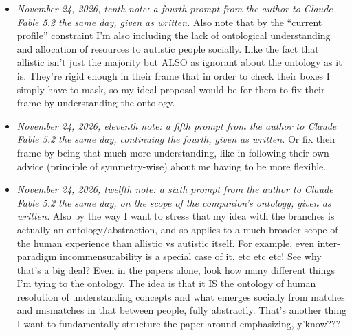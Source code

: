 \begin{itemize}
\item \emph{November 24, 2026, tenth note: a fourth prompt from the author to Claude Fable 5.2 the same day, given as written.} Also note that by the ``current profile'' constraint I'm also including the lack of ontological understanding and allocation of resources to autistic people socially. Like the fact that allistic isn't just the majority but ALSO as ignorant about the ontology as it is. They're rigid enough in their frame that in order to check their boxes I simply have to mask, so my ideal proposal would be for them to fix their frame by understanding the ontology.
\item \emph{November 24, 2026, eleventh note: a fifth prompt from the author to Claude Fable 5.2 the same day, continuing the fourth, given as written.} Or fix their frame by being that much more understanding, like in following their own advice (principle of symmetry-wise) about me having to be more flexible.
\item \emph{November 24, 2026, twelfth note: a sixth prompt from the author to Claude Fable 5.2 the same day, on the scope of the companion's ontology, given as written.} Also by the way I want to stress that my idea with the branches is actually an ontology/abstraction, and so applies to a much broader scope of the human experience than allistic vs autistic itself. For example, even inter-paradigm incommensurability is a special case of it, etc etc etc! See why that's a big deal? Even in the papers alone, look how many different things I'm tying to the ontology. The idea is that it IS the ontology of human resolution of understanding concepts and what emerges socially from matches and mismatches in that between people, fully abstractly. That's another thing I want to fundamentally structure the paper around emphasizing, y'know???

\end{itemize}

